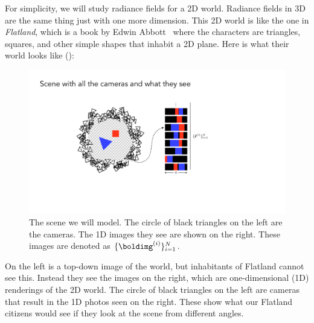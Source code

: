 For simplicity, we will study radiance fields for a 2D world. Radiance fields in 3D are the same thing just with one more dimension.
This 2D world is like the one in \textit{Flatland}, which is a book by Edwin Abbott~\cite{abbott2009flatland} where the characters are triangles, squares, and other simple shapes that inhabit a 2D plane. %
Here is what their world looks like (\fig{\ref{fig:nerfs:flatland_cameras_and_images}}):
\begin{figure}[h!]
    \centerline{
        \includegraphics[width=0.65\linewidth]{figures/nerfs/flatland_cameras_and_images.pdf}
    }
    \caption{The scene we will model. The circle of black triangles on the left are the cameras. The 1D images they see are shown on the right. These images are denoted as $\{\boldimg^{(i)}\}_{i=1}^N$.}
    \label{fig:nerfs:flatland_cameras_and_images}
\end{figure}

On the left is a top-down image of the world, but inhabitants of Flatland cannot see this. Instead they see the images on the right,
which are one-dimensional (1D) renderings of the 2D world. The circle of black triangles on the left are cameras that result in the 1D photos seen on the right. These show what our Flatland citizens would see if they look at the scene from different angles.

